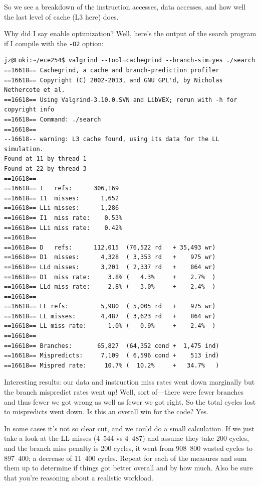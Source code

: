 \documentclass[a4paper]{report}
\begin{document}
So we see a breakdown of the instruction accesses, data accesses, and how well the last level of cache (L3 here) does. 

Why did I say enable optimization? Well, here's the output of the search program if I compile with the \texttt{-O2} option:

\begin{verbatim}
jz@Loki:~/ece254$ valgrind --tool=cachegrind --branch-sim=yes ./search
==16618== Cachegrind, a cache and branch-prediction profiler
==16618== Copyright (C) 2002-2013, and GNU GPL'd, by Nicholas Nethercote et al.
==16618== Using Valgrind-3.10.0.SVN and LibVEX; rerun with -h for copyright info
==16618== Command: ./search
==16618== 
--16618-- warning: L3 cache found, using its data for the LL simulation.
Found at 11 by thread 1 
Found at 22 by thread 3 
==16618== 
==16618== I   refs:      306,169
==16618== I1  misses:      1,652
==16618== LLi misses:      1,286
==16618== I1  miss rate:    0.53%
==16618== LLi miss rate:    0.42%
==16618== 
==16618== D   refs:      112,015  (76,522 rd   + 35,493 wr)
==16618== D1  misses:      4,328  ( 3,353 rd   +    975 wr)
==16618== LLd misses:      3,201  ( 2,337 rd   +    864 wr)
==16618== D1  miss rate:     3.8% (   4.3%     +    2.7%  )
==16618== LLd miss rate:     2.8% (   3.0%     +    2.4%  )
==16618== 
==16618== LL refs:         5,980  ( 5,005 rd   +    975 wr)
==16618== LL misses:       4,487  ( 3,623 rd   +    864 wr)
==16618== LL miss rate:      1.0% (   0.9%     +    2.4%  )
==16618== 
==16618== Branches:       65,827  (64,352 cond +  1,475 ind)
==16618== Mispredicts:     7,109  ( 6,596 cond +    513 ind)
==16618== Mispred rate:     10.7% (  10.2%     +   34.7%   )
\end{verbatim}

Interesting results: our data and instruction miss rates went down marginally but the branch mispredict rates went up! Well, sort of---there were fewer branches and thus fewer we got wrong as well as fewer we got right. So the total cycles lost to mispredicts went down. Is this an overall win for the code? Yes. 

In some cases it's not so clear cut, and we could do a small calculation. If we just take a look at the LL misses (4~544 vs 4~487) and assume they take 200 cycles, and the branch miss penalty is 200 cycles, it went from 908~800 wasted cycles to 897~400; a decrease of 11~400 cycles. Repeat for each of the measures and sum them up to determine if things got better overall and by how much. Also be sure that you're reasoning about a realistic workload.
\end{document}
